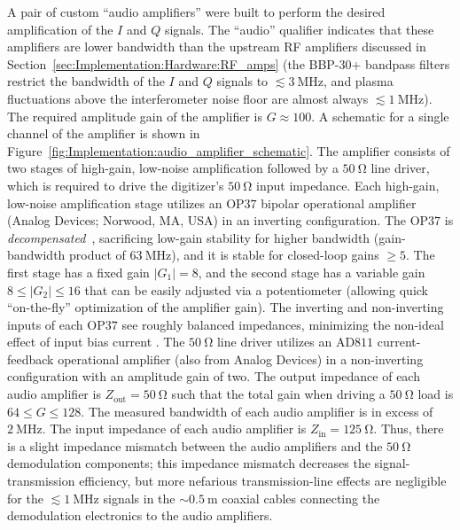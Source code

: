 A pair of custom ``audio amplifiers'' were built to
perform the desired amplification of the $I$ and $Q$ signals.
The ``audio'' qualifier indicates that
these amplifiers are lower bandwidth
than the upstream RF amplifiers discussed in
Section~\ref{sec:Implementation:Hardware:RF_amps}
(the {BBP-$30$+} bandpass filters
restrict the bandwidth of the $I$ and $Q$ signals
to $\lesssim \SI{3}{\mega\hertz}$, and
plasma fluctuations above the interferometer noise floor
are almost always $\lesssim \SI{1}{\mega\hertz}$).
The required amplitude gain of the amplifier is $G \approx 100$.
A schematic for a single channel of the amplifier is shown in
Figure~\ref{fig:Implementation:audio_amplifier_schematic}.
The amplifier consists of two stages
of high-gain, low-noise amplification
followed by a $\SI{50}{\ohm}$ line driver,
which is required to drive the digitizer's $\SI{50}{\ohm}$ input impedance.
Each high-gain, low-noise amplification stage
utilizes an {OP$37$} bipolar operational amplifier
(Analog Devices; Norwood, MA, USA)
in an inverting configuration.
The {OP$37$} is \emph{decompensated}~\cite[Sec.~4.9]{horowitz_and_hill},
sacrificing low-gain stability for higher bandwidth
(gain-bandwidth product of $\SI{63}{\mega\hertz}$), and
it is stable for closed-loop gains $\geq 5$.
The first stage has a fixed gain $|G_1| = 8$, and
the second stage has a variable gain $8 \leq |G_2| \leq 16$
that can be easily adjusted via a potentiometer
(allowing quick ``on-the-fly'' optimization of the amplifier gain).
The inverting and non-inverting inputs
of each {OP$37$} see roughly balanced impedances,
minimizing the non-ideal effect of input bias current
\cite[Sec.~4.4.2.E]{horowitz_and_hill}.
The $\SI{50}{\ohm}$ line driver
utilizes an {AD$811$} current-feedback operational amplifier
(also from Analog Devices)
in a non-inverting configuration with an amplitude gain of two.
The output impedance of each audio amplifier is
$Z_{\text{out}} = \SI{50}{\ohm}$ such that
the total gain when driving a $\SI{50}{\ohm}$ load
is $64 \leq G \leq 128$.
The measured bandwidth of each audio amplifier
is in excess of $\SI{2}{\mega\hertz}$.
The input impedance of each audio amplifier is
$Z_{\text{in}} = \SI{125}{\ohm}$.
Thus, there is a slight impedance mismatch between
the audio amplifiers and the $\SI{50}{\ohm}$ demodulation components;
this impedance mismatch decreases the signal-transmission efficiency, but
more nefarious transmission-line effects are negligible
for the $\lesssim \SI{1}{\mega\hertz}$ signals
in the $\sim \SI{0.5}{\meter}$ coaxial cables
connecting the demodulation electronics to the audio amplifiers.
